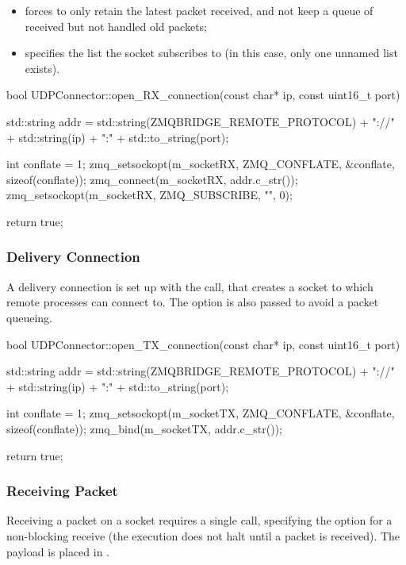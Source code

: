 \begin{itemize}
	\item {} forces  to only retain the latest \gls{packet} received, and not keep a queue of received but not handled old \glspl{packet};
	\item {} specifies the list the socket subscribes to (in this case, only one unnamed list exists).
\end{itemize}

\begin{codelist}{1}
bool UDPConnector::open_RX_connection(const char* ip, const uint16_t port) {

    std::string addr = std::string(ZMQBRIDGE_REMOTE_PROTOCOL) + "://" + std::string(ip) + ":" + std::to_string(port);

    int conflate = 1;
    zmq_setsockopt(m_socketRX, ZMQ_CONFLATE, &conflate, sizeof(conflate));
    zmq_connect(m_socketRX, addr.c_str());
    zmq_setsockopt(m_socketRX, ZMQ_SUBSCRIBE, "", 0);

    return true;
}
\end{codelist}

\subsubsection{Delivery Connection}

A delivery connection is set up with the  call, that creates a socket to which remote  processes can connect to. The  option is also passed to avoid a \gls{packet} queueing.

\begin{codelist}{1}
bool UDPConnector::open_TX_connection(const char* ip, const uint16_t port) {
    std::string addr = std::string(ZMQBRIDGE_REMOTE_PROTOCOL) + "://" + std::string(ip) + ":" + std::to_string(port);

    int conflate = 1;
    zmq_setsockopt(m_socketTX, ZMQ_CONFLATE, &conflate, sizeof(conflate));
    zmq_bind(m_socketTX, addr.c_str());

    return true;
}
\end{codelist}

\subsubsection{Receiving Packet}

Receiving a \gls{packet} on a socket requires a single  call, specifying the  option for a non-blocking receive (the execution does not halt until a \gls{packet} is received). The \gls{payload} is placed in .

